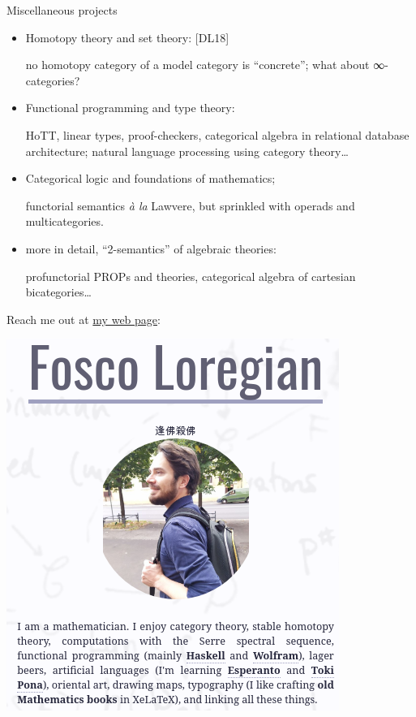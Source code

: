 \documentclass[handout]{beamer}
\def\lnk#1{\href{#1}{\faFilePdfO}}
\begin{document}
%
%
%
%
%
%
%
\begin{frame}{Miscellaneous projects}
\small
\begin{itemize}
  \item<+-> Homotopy theory and set theory: [\alert{DL18}\lnk{https://link.springer.com/article/10.1007/s40062-018-0197-3}]
  
  {\color{gray!70}\footnotesize  no homotopy category of a model category is ``concrete''; what about ∞-categories?}
  \item<+-> Functional programming and type theory:
  
  {\color{gray!70}\footnotesize  HoTT, linear types, proof-checkers, categorical algebra in relational database architecture; natural language processing using category theory\dots}
  \item<+-> Categorical logic and foundations of mathematics;
  
  {\color{gray!70}\footnotesize  functorial semantics \emph{à la} Lawvere, but sprinkled with operads and multicategories.}
  \item<+-> more in detail, ``2-semantics'' of algebraic theories: 
  
  {\color{gray!70}\footnotesize profunctorial PROPs and theories, categorical algebra of cartesian bicategories\dots}
\end{itemize}
\end{frame}
%
\begin{frame}
Reach me out at \href{http://tetrapharmakon.github.io}{my web page}:
\begin{center}
\href{http://tetrapharmakon.github.io}{
\includegraphics[width=.2\textwidth]{crop1.png}
}
\end{center}
\end{frame}
%
%
%
%
%
\end{document}
